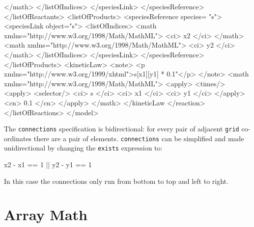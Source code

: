 \documentclass{cekarticle}
\begin{document}
\begin{example}
                            </math>
                        </listOfIndices>
                    </speciesLink>
                </speciesReference>
            </listOfReactants>
            <listOfProducts>
                <speciesReference species= "s">
                    <speciesLink object="s">
                        <listOfIndices>
                            <math xmlns="http://www.w3.org/1998/Math/MathML">
                                <ci> x2 </ci>
                            </math>
                            <math xmlns="http://www.w3.org/1998/Math/MathML">
                                <ci> y2 </ci>
                            </math>
                        </listOfIndices>
                    </speciesLink>
                </speciesReference>
            </listOfProducts>
            <kineticLaw>
                <note>
                    <p xmlns="http://www.w3.org/1999/xhtml">s[x1][y1] * 0.1"</p>
                </note>                
                <math xmlns="http://www.w3.org/1998/Math/MathML">
                    <apply>
                        <times/>
                        <apply>
                            <selector/>
                            <ci> s </ci>
                            <ci> x1 </ci>
                            <ci> y1 </ci>
                        </apply>
                        <cn> 0.1 </cn>                            
                    </apply>
                </math>
            </kineticLaw
        </reaction>
    </listOfReactions>
</model>
\end{example}

The \texttt{connections} specification is bidirectional: for every
pair of adjacent \texttt{grid} co-ordinates there are a pair of
elements. \texttt{connections} can be simplified and made
unidirectional by changing the \texttt{exists} expression
to:
\begin{example}
x2 - x1 == 1 || y2 - y1 == 1
\end{example}
In this case the connections only run from bottom to top and left
to right.

\section{Array Math}
\label{sec:math}
\end{document}
